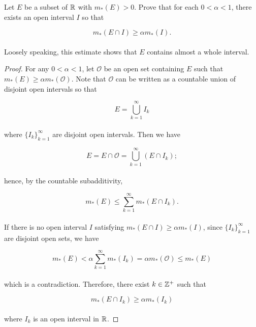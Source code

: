 \documentclass[12pt, a4paper, openany, twoside]{book}
\theoremstyle{definition}
\theoremstyle{remark}
\theoremstyle{plain}
\numberwithin{equation}{section}
\begin{document}
\begin{tcolorbox}[colback=yellow!10!white,colframe=gray!75!black,title=Exercise 1.28]\label{Exercise 1.28}
    Let $E$ be a subset of ${\mathbb {R}}$ with $m_*(E)>0$. Prove that for each $0<\alpha<1$, there exists an open interval $I$ so that

    \[m_*(E\cap I)\geq \alpha m_*(I).\]
    \\
    Loosely speaking, this estimate shows that $E$ contains almost a whole interval.

\end{tcolorbox}
\begin{proof} 
    For any $0<\alpha<1$, let $\mathcal{O}$ be an open set containing $E$ such that $m_*(E)\geq\alpha m_*(\mathcal{O})$. Note that $\mathcal{O}$ can be written as a countable union of disjoint open intervals so that

    \[E=\bigcup_{k=1}^{\infty}{I_k}\]
    \\
    where $\{I_k\}_{k=1}^{\infty}$ are disjoint open intervals. Then we have

    \[E=E\cap\mathcal{O}=\bigcup_{k=1}^{\infty}{(E\cap I_k)};\]
    \\
    hence, by the countable subadditivity, 

    \[m_*(E)\leq\sum_{k=1}^{\infty}{m_*(E\cap I_k)}.\]
    \\
    If there is no open interval $I$ satisfying $m_*(E\cap I)\geq\alpha m_*(I)$, since $\{I_k\}_{k=1}^{\infty}$ are disjoint open sets, we have

    \[m_*(E)<\alpha\sum_{k=1}^{\infty}{m_*(I_k)}=\alpha m_*(\mathcal{O})\leq m_*(E)\]
    \\
    which is a contradiction. Therefore, there exist $k\in{\mathbb {Z}}^+$ such that

    \[m_*(E\cap I_k)\geq\alpha m_*(I_k)\]
    \\
    where $I_k$ is an open interval in ${\mathbb {R}}$.
\end{proof}

\newpage
\end{document}
